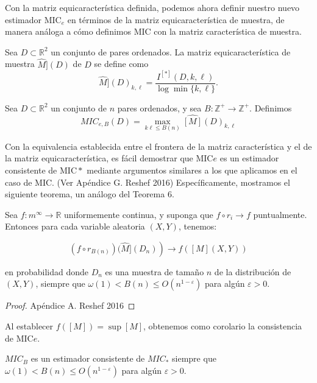 	Con la matriz equicaracter\'istica definida, podemos ahora definir nuestro nuevo estimador $\mathrm{MIC}_e$ en t\'erminos de la matriz equicaracter\'istica de muestra, de manera an\'aloga a c\'omo definimos MIC con la matriz caracter\'istica de muestra.

	\begin{defn}
		Sea $D \subset \mathbb{R}^2$ un conjunto de pares ordenados. La matriz equicaracter\'istica de muestra $\widehat{M}](D)$ de $D$ se define como
		$$
		\widehat{M}](D)_{k, \ell}=\frac{I^{[*]}(D, k, \ell)}{\log \min \{k, \ell\}} .
		$$
	\end{defn}
	\begin{defn}
		Sea $D \subset \mathbb{R}^2$ un conjunto de $n$ pares ordenados, y sea $B: \mathbb{Z}^{+} \rightarrow \mathbb{Z}^{+}$. Definimos
		$$
		M I C_{e, B}(D)=\max _{k \ell \leq B(n)} \widehat{[M]}(D)_{k, \ell}
		$$
	\end{defn}



	Con la equivalencia establecida entre el frontera de la matriz caracter\'istica y el de la matriz equicaracter\'istica, es f\'acil demostrar que $\mathrm{MIC}e$ es un estimador consistente de $\mathrm{MIC}*$ mediante argumentos similares a los que aplicamos en el caso de MIC. (Ver Ap\'endice G. Reshef 2016) Espec\'ificamente, mostramos el siguiente teorema, un an\'alogo del Teorema 6.
	
	\begin{thm}
		Sea $f: m^{\infty} \rightarrow \mathbb{R}$ uniformemente continua, y suponga que $f \circ r_i \rightarrow f$ puntualmente. Entonces para cada variable aleatoria $(X, Y)$, tenemos:

		$$
		\left.\left(f \circ r_{B(n)}\right)(\widehat{M}]\left(D_n\right)\right) \rightarrow f([M](X, Y))
		$$

		en probabilidad donde $D_n$ es una muestra de tama\~no $n$ de la distribuci\'on de $(X, Y)$, siempre que $\omega(1)<B(n) \leq O\left(n^{1-\varepsilon}\right)$ para alg\'un $\varepsilon>0$.
	\end{thm}
	\begin{proof}
		Ap\'endice A. Reshef 2016
	\end{proof}

	Al establecer $f([M])=\sup [M]$, obtenemos como corolario la consistencia de $\mathrm{MIC}e$.
	
	\begin{cor}
		$M I C_{B}$ es un estimador consistente de $M I C_*$ siempre que $\omega(1)<B(n) \leq O\left(n^{1-\varepsilon}\right)$ para alg\'un $\varepsilon>0$.
	\end{cor}
	

